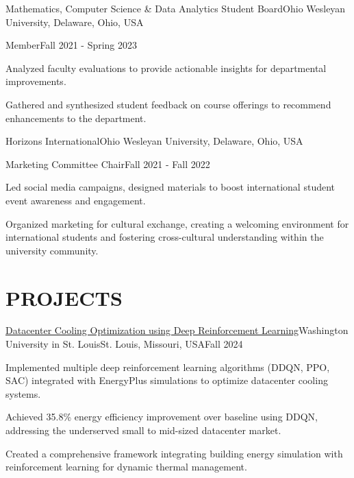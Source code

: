 \begin{leadershipentry}{Mathematics, Computer Science \& Data Analytics Student Board}{Ohio Wesleyan University, Delaware, Ohio, USA}
    \begin{positionentry}{Member}{Fall 2021 - Spring 2023}
        \item Analyzed faculty evaluations to provide actionable insights for departmental improvements.
        \item Gathered and synthesized student feedback on course offerings to recommend enhancements to the department.
    \end{positionentry}
\end{leadershipentry}

\begin{leadershipentry}{Horizons International}{Ohio Wesleyan University, Delaware, Ohio, USA}
    \begin{positionentry}{Marketing Committee Chair}{Fall 2021 - Fall 2022}
        \item Led social media campaigns, designed materials to boost international student event awareness and engagement.
        \item Organized marketing for cultural exchange, creating a welcoming environment for international students and fostering cross-cultural understanding within the university community.
    \end{positionentry}
\end{leadershipentry}

\vspace{\headerSpacing}
\section{PROJECTS}

\begin{projectentry}{\href{https://github.com/agopalareddy/CSE510A_Datacenter_Cooling}{Datacenter Cooling Optimization using Deep Reinforcement Learning}}{Washington University in St. Louis}{St. Louis, Missouri, USA}{Fall 2024}
    \item Implemented multiple deep reinforcement learning algorithms (DDQN, PPO, SAC) integrated with EnergyPlus simulations to optimize datacenter cooling systems.
    \item Achieved 35.8\% energy efficiency improvement over baseline using DDQN, addressing the underserved small to mid-sized datacenter market.
    \item Created a comprehensive framework integrating building energy simulation with reinforcement learning for dynamic thermal management.
\end{projectentry}

